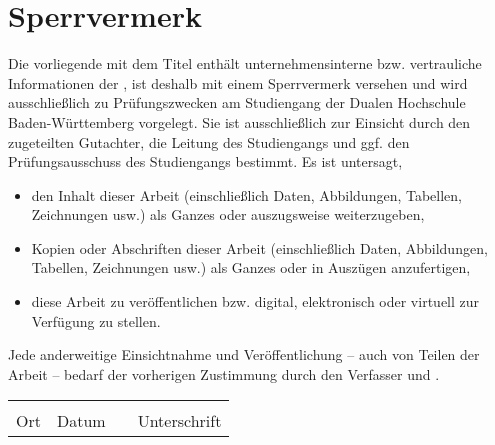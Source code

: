 \thispagestyle{empty}
\section*{Sperrvermerk}

\vspace*{2em}

  Die vorliegende {\vartype} mit dem Titel {\itshape{} \vartitle{}\/} enthält unternehmensinterne bzw. vertrauliche Informationen der {\varcompany}, ist deshalb mit einem Sperrvermerk versehen und wird ausschließlich zu Prüfungszwecken am Studiengang {\studiengang} der Dualen Hochschule Baden-Württemberg {\dhbw} vorgelegt. Sie ist ausschließlich zur Einsicht durch den zugeteilten Gutachter, die Leitung des Studiengangs und ggf. den Prüfungsausschuss des Studiengangs bestimmt.  Es ist untersagt,
  \begin{itemize}
  \item den Inhalt dieser Arbeit (einschließlich Daten, Abbildungen, Tabellen, Zeichnungen usw.) als Ganzes oder auszugsweise weiterzugeben,
  \item Kopien oder Abschriften dieser Arbeit (einschließlich Daten, Abbildungen, Tabellen, Zeichnungen usw.) als Ganzes oder in Auszügen anzufertigen,
  \item diese Arbeit zu veröffentlichen bzw. digital, elektronisch oder virtuell zur Verfügung zu stellen. 
  \end{itemize}
Jede anderweitige Einsichtnahme und Veröffentlichung – auch von Teilen der Arbeit – bedarf der vorherigen Zustimmung durch den Verfasser und {\varcompany}.

\vspace{3em}

\begin{tabular}{ p{3cm}p{3cm}p{1cm}p{5cm} }
        \hrulefill & \hrulefill & & \hrulefill\\
        Ort & Datum & & Unterschrift\\
\end{tabular}
